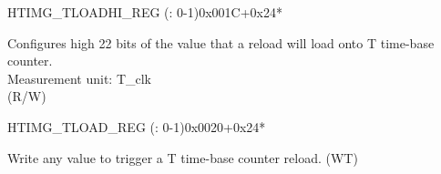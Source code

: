 \begin{register}{H}{TIMG\_TLOADHI\_REG (: 0-1)}{0x001C+0x24*}\label{regdesc:TIMGTXLOADHIREG}
%
%
\regnewline%
\begin{regdesc}\begin{reglist}
\label{fielddesc:TIMGTXLOADHI}\item [TIMG\_T\regindex{x}\_LOAD\_HI] Configures high 22 bits of the value that a reload will load onto T time-base counter. \\
Measurement unit: T\_clk \\ (R/W)
\end{reglist}\end{regdesc}
\end{register}


\begin{register}{H}{TIMG\_TLOAD\_REG (: 0-1)}{0x0020+0x24*}\label{regdesc:TIMGTXLOADREG}
%
\regnewline%
\begin{regdesc}\begin{reglist}
\label{fielddesc:TIMGTXLOAD}\item [TIMG\_T\regindex{x}\_LOAD] Write any value to trigger a T time-base counter reload. (WT)
\end{reglist}\end{regdesc}
\end{register}



